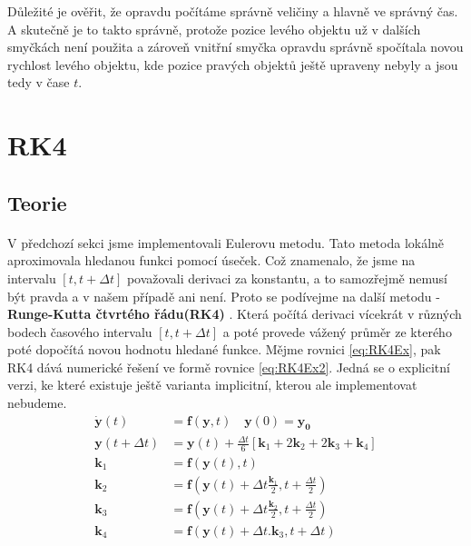 Důležité je ověřit, že opravdu počítáme správně veličiny a hlavně ve správný čas. A skutečně je to takto správně, protože pozice levého objektu už v dalších smyčkách není použita a zároveň vnitřní smyčka opravdu správně spočítala novou rychlost levého objektu, kde pozice pravých objektů ještě upraveny nebyly a jsou tedy v čase $ t $.


\section{RK4}
\label{sec:implRK4}
\subsection{Teorie}
\paragraph{}

V předchozí sekci jsme implementovali Eulerovu metodu. Tato metoda lokálně aproximovala hledanou funkci pomocí úseček. Což znamenalo, že jsme na intervalu $ \left[ t,t+\Delta t\right]  $ považovali derivaci za konstantu, a to samozřejmě nemusí být pravda a v našem případě ani není. Proto se podívejme na další metodu -  \textbf{Runge-Kutta čtvrtého řádu(RK4)} . Která počítá derivaci vícekrát v různých bodech časového intervalu $ \left[ t,t+\Delta t\right]  $ a poté provede vážený průměr ze kterého poté dopočítá novou hodnotu hledané funkce. Mějme rovnici \eqref{eq:RK4Ex}, pak RK4 dává numerické řešení ve formě rovnice \eqref{eq:RK4Ex2}. Jedná se o explicitní verzi, ke které existuje ještě varianta implicitní, kterou ale implementovat nebudeme.
\begin{align}
\label{eq:RK4Ex}
\boldsymbol{\dot y} (t) &= \boldsymbol{f}(\boldsymbol{y},t) \quad \boldsymbol{y}(0)=\boldsymbol{y_0}\\
\label{eq:RK4Ex2}
\boldsymbol{y}(t + \Delta t) &= \boldsymbol{y}(t) + \frac{\Delta t}{6}\left[ \boldsymbol{k}_1 + 2\boldsymbol{k}_2 + 2\boldsymbol{k}_3 + \boldsymbol{ k}_4\right] \\
\boldsymbol{k}_1 &= \boldsymbol{f}(\boldsymbol{y}(t),t)\nonumber\\
\boldsymbol{k}_2 &= \boldsymbol{f}(\boldsymbol{y}(t) + \Delta t\frac{\boldsymbol{k}_1}{2}, t+\frac{\Delta t}{2})\nonumber \\
\boldsymbol{k}_3 &= \boldsymbol{f}(\boldsymbol{y}(t) + \Delta t\frac{\boldsymbol{k}_2}{2}, t+\frac{\Delta t}{2})\nonumber \\
\boldsymbol{k}_4 &= \boldsymbol{f}(\boldsymbol{y}(t) + \Delta t. \boldsymbol{k}_3, t+\Delta t)\nonumber
\end{align}

